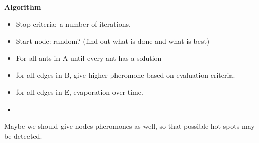 \textbf{Algorithm}
\begin{itemize}
\item Stop criteria: a number of iterations. 
\item Start node: random? (find out what is done and what is best)
\item For all ants in A until every ant has a solution
\item for all edges in B, give higher pheromone based on evaluation criteria. 
\item for all edges in E, evaporation over time. 
\item 
\end{itemize}

Maybe we should give nodes pheromones as well, so that possible hot spots may be detected.

